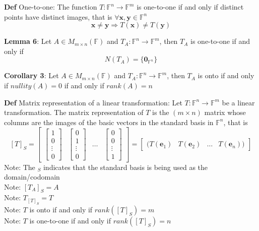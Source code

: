 \documentclass[11pt,notitlepage]{report}
\newcommand{\bb}[1]{\ensuremath{\mathbb{#1}}}
\newcommand{\tbf}[1]{\textbf{#1}}
\begin{document}
\textbf{Def} One-to-one: The function $T: \bb F^n \rightarrow \bb F^m$ is one-to-one if and only if distinct points have distinct images, that is $\forall \tbf x, \tbf y \in \bb F^n$
$$\tbf x \ne \tbf y \Longrightarrow T(\tbf x) \ne T(\tbf y)$$

\textbf{Lemma 6}: Let $A \in M_{m \times n}(\bb F)$ and $T_A : \bb F^n \rightarrow \bb F^m$, then $T_A$ is one-to-one if and only if
$$N(T_A) = \{\tbf 0_{\bb F^n}\}$$

\textbf{Corollary 3}: Let $A \in M_{m \times n}(\bb F)$ and $T_A : \bb F^n \rightarrow \bb F^m$, then $T_A$ is onto if and only if $nullity(A) = 0$ if and only if $rank(A) = n$

\textbf{Def} Matrix representation of a linear transformation: Let $T: \bb F^n \rightarrow \bb F^m$ be a linear transformation. The matrix representation of $T$ is the $(m \times n)$ matrix whose columns are the images of the basic vectors in the standard basis in $\bb F^n$, that is
$$[T]_S = \begin{bmatrix}
\begin{bmatrix}1\\0\\ \vdots\\0\end{bmatrix} & \begin{bmatrix}0\\1\\ \vdots\\0\end{bmatrix} & \dots & \begin{bmatrix}0\\0\\ \vdots\\1\end{bmatrix}
\end{bmatrix} = \begin{bmatrix}
(T(\tbf e_1) & T(\tbf e_2) & \dots & T(\tbf e_n))
\end{bmatrix}$$
\hspace*{5mm} Note: The $_S$ indicates that the standard basis is being used as the domain/codomain\\
\hspace*{5mm} Note: $[T_A]_S = A$\\
\hspace*{5mm} Note: $T_{[T]_S} = T$\\
\hspace*{5mm} Note: $T$ is onto if and only if $rank([T]_S) = m$\\
\hspace*{5mm} Note: $T$ is one-to-one if and only if $rank([T]_S) = n$
\end{document}
